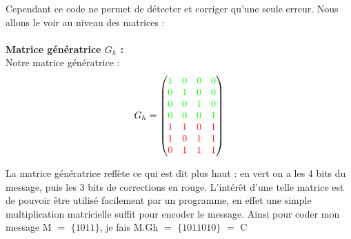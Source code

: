 Cependant ce code ne permet de détecter et corriger qu'une seule erreur. Nous allons le voir au niveau des matrices :
\\
\\ \textbf{Matrice génératrice $G_h$ :}
\\
Notre matrice génératrice :\\
\begin{align*}
  G_h =
  \left(
    \begin{matrix}
      \textcolor{green}{1} & \textcolor{green}{0} & \textcolor{green}{0} & \textcolor{green}{0} \\
      \textcolor{green}{0} & \textcolor{green}{1} & \textcolor{green}{0} & \textcolor{green}{0} \\
      \textcolor{green}{0} & \textcolor{green}{0} & \textcolor{green}{1} & \textcolor{green}{0} \\
      \textcolor{green}{0} & \textcolor{green}{0} & \textcolor{green}{0} & \textcolor{green}{1} \\
      \textcolor{red}{1} & \textcolor{red}{1} & \textcolor{red}{0} & \textcolor{red}{1} \\
      \textcolor{red}{1} & \textcolor{red}{0} & \textcolor{red}{1} & \textcolor{red}{1} \\
      \textcolor{red}{0} & \textcolor{red}{1} & \textcolor{red}{1} & \textcolor{red}{1}
    \end{matrix}
  \right)
\end{align*}

La matrice génératrice reflète ce qui est dit plus haut : en vert on a les 4 bits du message, puis les 3 bits de corrections en rouge. L'intérêt d’une telle matrice est de pouvoir être utilisé facilement par un programme, en effet une simple multiplication matricielle suffit pour encoder le message.
Ainsi pour coder mon message M $=$ $\{1011\}$, je fais M.Gh $=$ $\{1011010\}$ $=$ C
\\ \\

